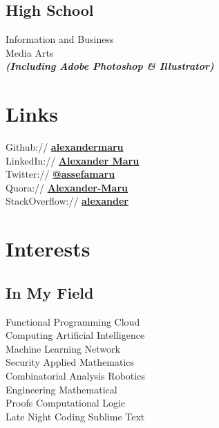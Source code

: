 \documentclass[letterpaper]{deedy-resume}
\begin{document}
\begin{minipage}[t]{0.33\textwidth}

\subsection{High School}

Information and Business \\
Media Arts \\
{\footnotesize \textit{\textbf{(Including Adobe Photoshop \& Illustrator) }}}

\sectionspace 




\section{Links} 

Github:// \href{https://github.com/alexandermaru}{\bf alexandermaru} \\
LinkedIn:// \href{https://goo.gl/B7Jwf1}{\bf Alexander Maru} \\
Twitter:// \href{https://twitter.com/assefamaru}{\bf @assefamaru} \\
Quora:// \href{https://www.quora.com/Alexander-Maru}{\bf Alexander-Maru} \\
StackOverflow:// \href{http://stackoverflow.com/users/4739247/alexander?tab=profile}{\bf alexander}

\sectionspace 

\sectionspace 



\section{Interests}

\subsection{In My Field}

Functional Programming \textbullet{} Cloud \\ Computing \textbullet{} Artificial Intelligence \\ \textbullet{} Machine Learning \textbullet{} Network\\ Security \textbullet{} Applied Mathematics\\ \textbullet{} Combinatorial Analysis \textbullet{} Robotics\\ \textbullet{} Engineering \textbullet{} Mathematical\\ Proofs \textbullet{} Computational Logic\\ \textbullet{} Late Night Coding \textbullet{} Sublime Text \\


\end{minipage}
\end{document}
